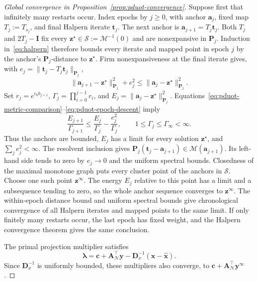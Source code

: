 \begin{proof}[Global convergence in Proposition~\ref{prop:pduot-convergence}]
Suppose first that infinitely many restarts occur.
Index epochs by $j\geq0$, with anchor $\mathbf a_j$, fixed map $T_j:=T_{s_j}$, and final Halpern iterate $\mathbf t_j$.
The next anchor is $\mathbf a_{j+1}=T_j\mathbf t_j$.
Both $T_j$ and $2T_j-\mathbf I$ fix every $\mathbf z^\star\in\mathcal S:=\mathcal M^{-1}(0)$ and are nonexpansive in $\mathbf P_j$.
Induction in~\eqref{eq:halpern} therefore bounds every iterate and mapped point in epoch $j$ by the anchor's $\mathbf P_j$-distance to $\mathbf z^\star$.
Firm nonexpansiveness at the final iterate gives, with $e_j=\|\mathbf t_j-T_j\mathbf t_j\|_{\mathbf P_j}$,
\begin{equation}
\label{eq:pduot-epoch-descent}
\|\mathbf a_{j+1}-\mathbf z^\star\|_{\mathbf P_j}^2+e_j^2\leq\|\mathbf a_j-\mathbf z^\star\|_{\mathbf P_j}^2.
\end{equation}
Set $r_j=e^{c_0b_{j+1}}$, $\Gamma_j=\prod_{i=0}^{j-1}r_i$, and $E_j=\|\mathbf a_j-\mathbf z^\star\|_{\mathbf P_j}^2$.
Equations~\eqref{eq:pduot-metric-comparison}--\eqref{eq:pduot-epoch-descent} imply
\begin{equation*}
\frac{E_{j+1}}{\Gamma_{j+1}}\leq\frac{E_j}{\Gamma_j}-\frac{e_j^2}{\Gamma_j},\qquad 1\leq\Gamma_j\leq\Gamma_\infty<\infty.
\end{equation*}
Thus the anchors are bounded, $E_j$ has a limit for every solution $\mathbf z^\star$, and $\sum_je_j^2<\infty$.
The resolvent inclusion gives $\mathbf P_j(\mathbf t_j-\mathbf a_{j+1})\in\mathcal M(\mathbf a_{j+1})$.
Its left-hand side tends to zero by $e_j\to0$ and the uniform spectral bounds.
Closedness of the maximal monotone graph puts every cluster point of the anchors in $\mathcal S$.
Choose one such point $\mathbf z^\infty$.
The energy $E_j$ relative to this point has a limit and a subsequence tending to zero, so the whole anchor sequence converges to $\mathbf z^\infty$.
The within-epoch distance bound and uniform spectral bounds give chronological convergence of all Halpern iterates and mapped points to the same limit.
If only finitely many restarts occur, the last epoch has fixed weight, and the Halpern convergence theorem gives the same conclusion.

The primal projection multiplier satisfies
\begin{equation*}
\boldsymbol\lambda=\mathbf c+\mathbf A_{\mathcal N}^{\top}\mathbf y-\mathbf D_x^{-1}(\mathbf x-\widehat{\mathbf x}).
\end{equation*}
Since $\mathbf D_x^{-1}$ is uniformly bounded, these multipliers also converge, to $\mathbf c+\mathbf A_{\mathcal N}^{\top}\mathbf y^\infty$.
\end{proof}
